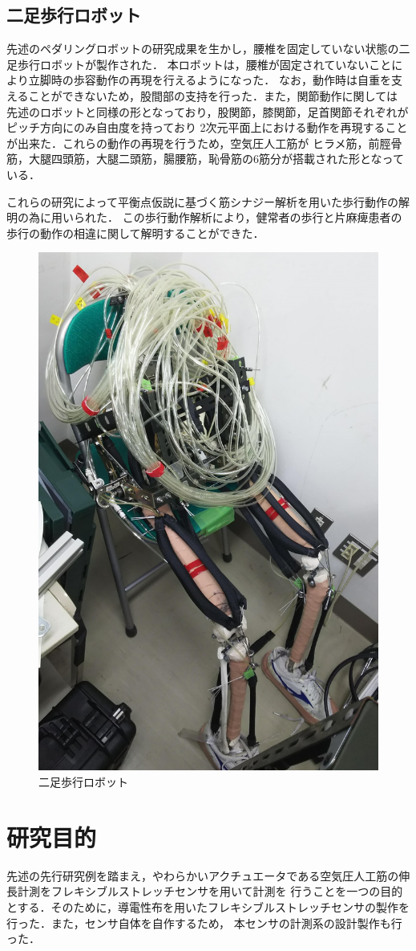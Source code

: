 \newpage

\subsection{二足歩行ロボット}
先述のペダリングロボットの研究成果を生かし，腰椎を固定していない状態の二足歩行ロボットが製作された．
本ロボットは，腰椎が固定されていないことにより立脚時の歩容動作の再現を行えるようになった．
なお，動作時は自重を支えることができないため，股間部の支持を行った．また，関節動作に関しては
先述のロボットと同様の形となっており，股関節，膝関節，足首関節それぞれがピッチ方向にのみ自由度を持っており
2次元平面上における動作を再現することが出来た．これらの動作の再現を行うため，空気圧人工筋が
ヒラメ筋，前脛骨筋，大腿四頭筋，大腿二頭筋，腸腰筋，恥骨筋の6筋分が搭載された形となっている．

これらの研究によって平衡点仮説に基づく筋シナジー解析を用いた歩行動作の解明の為に用いられた．
この歩行動作解析により，健常者の歩行と片麻痺患者の歩行の動作の相違に関して解明することができた．
\begin{figure}[h]
  \begin{center}
  \includegraphics[width=0.35\columnwidth,clip]{./1_prolusion/2nd.eps}
  \caption{二足歩行ロボット}
  \label{2号機}
 \end{center}
\end{figure}

\newpage

\section{研究目的}
先述の先行研究例を踏まえ，やわらかいアクチュエータである空気圧人工筋の伸長計測をフレキシブルストレッチセンサを用いて計測を
行うことを一つの目的とする．そのために，導電性布を用いたフレキシブルストレッチセンサの製作を行った．また，センサ自体を自作するため，
本センサの計測系の設計製作も行った．

